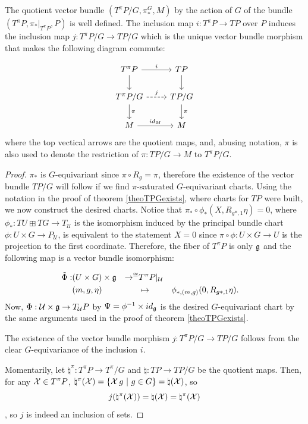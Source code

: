 \begin{theorem}\label{theoTpiPGSubbundle}
The quotient vector bundle $(T^\pi P/G, \pi^G_*, M)$ by the action of $G$ of the bundle $(T^\pi P, \pi_*|_{T^\pi P}, P)$ is well defined. The inclusion map $i: T^\pi P \to TP$ over $P$ induces the inclusion map $j: T^\pi P/G \to TP/G$ which is the unique vector bundle morphism that makes the following diagram commute:

\begin{equation}
    \begin{tikzcd}
        T^\pi P \ar{r}{i} \ar{d} & TP \ar{d} \\
        T^\pi P/G \ar[dashed]{r}{j} \arrow{d}{\pi} & TP/G \arrow{d}{\pi} \\
        M \arrow{r}{id_M} & M
    \end{tikzcd}
\end{equation}
where the top vectical arrows are the quotient maps, and, abusing notation, $\pi$ is also used to denote the restriction of $\pi: TP/G \to M$ to $T^\pi P/G$.
\end{theorem}

\begin{proof}
$\pi_*$ is $G$-equivariant since $\pi \circ R_g = \pi$, therefore the existence of the vector bundle $TP/G$ will follow if we find $\pi$-saturated $G$-equivariant charts. Using the notation in the proof of theorem \ref{theoTPGexists}, where charts for $TP$ were built, we now construct the desired charts. Notice that $\pi_* \circ \phi_* (X, R_{g*, 1} \eta) = 0$, where $\phi_* : TU \boxplus TG \to T_{\mathcal U}$ is the isomorphism induced by the principal bundle chart $\phi: U \times G \to P_{\mathcal U}$, is equivalent to the statement $X = 0$ since $\pi \circ \phi: U \times G \to U$ is the projection to the first coordinate. Therefore, the fiber of $T^\pi P$ is only $\mathfrak{g}$ and the following map is a vector bundle isomorphism:

\begin{align*}
    \Tilde \Phi :& (U \times G) \times \alg g & \to^{\cong} & T^\pi P|_{\mathcal U} \\    
                 & (m, g, \eta)&& \mapsto &&\phi_{*, (m, g)}(0, R_{g*, 1} \eta).
\end{align*}
Now, $\Phi : \mathcal U \times \mathfrak{g}  \to  T_{\mathcal U}P$ by $\Psi = \phi^{-1} \times id_{\alg g}$ is the desired $G$-equivariant chart by the same arguments used in the proof of theorem \ref{theoTPGexists}.

The existence of the vector bundle morphism $j: T^\pi P/G \to TP/G$ follows from the clear $G$-equivariance of the inclusion $i$.

Momentarily, let $\natural^\pi: T^\pi P \to T^\pi/G$ and $\natural: TP \to TP/G$ be the quotient maps. Then, for any $\mathcal{X} \in T^\pi P$, $\natural^\pi(\mathcal{X}) = \left\{ \mathcal{X} \, g \ |\  g \in G \right\} = \natural(\mathcal{X})$, so \[j(\natural^\pi(\mathcal{X})) = \natural(\mathcal{X}) = \natural^\pi(\mathcal{X})\], so $j$ is indeed an inclusion of sets.
\end{proof}

